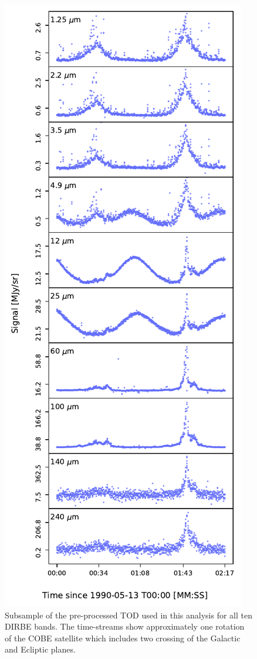 \documentclass[twocolumn]{aa}
\begin{document}
\begin{figure}
    \centering
    \includegraphics[width=\columnwidth]{figs/tod.pdf}
    \caption{Subsample of the pre-processed TOD used in this analysis for all ten DIRBE bands. The time-streams
    show approximately one rotation of the COBE satellite which includes two crossing of the Galactic and Ecliptic planes.}
    \label{fig:tod_zodi}
\end{figure}
\end{document}
